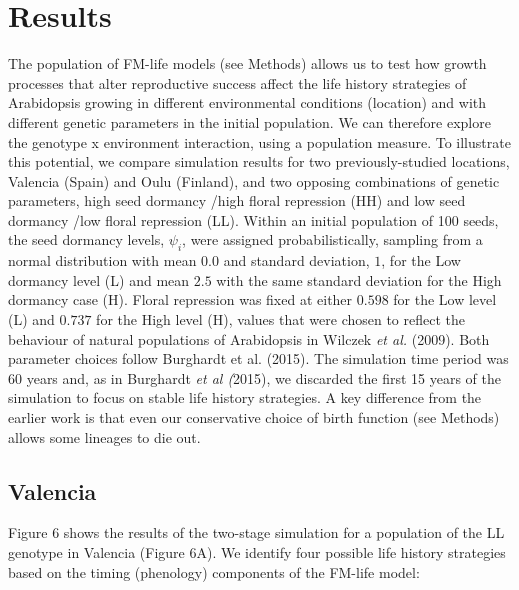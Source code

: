 \documentclass[phd]{infthesis}
\begin{document}
\section{Results}
\label{results}

The population of FM-life models (see Methods) allows us to test how
growth processes that alter reproductive success affect the life history
strategies of Arabidopsis growing in different environmental conditions
(location) and with different genetic parameters in the initial
population. We can therefore explore the genotype x environment
interaction, using a population measure. To illustrate this potential,
we compare simulation results for two previously-studied locations,
Valencia (Spain) and Oulu (Finland), and two opposing combinations of
genetic parameters, high seed dormancy /high floral repression (HH) and
low seed dormancy /low floral repression (LL). Within an initial
population of 100 seeds, the seed dormancy levels, \(\psi_{i}\), were
assigned probabilistically, sampling from a normal distribution with
mean \(0.0\) and standard deviation, \(1\), for the Low dormancy level
(L) and mean \(2.5\) with the same standard deviation for the High
dormancy case (H). Floral repression was fixed at either \(0.598\) for
the Low level (L) and \(0.737\) for the High level (H), values that were
chosen to reflect the behaviour of natural populations of Arabidopsis in
Wilczek \emph{et al.} (2009). Both parameter choices follow Burghardt et
al. (2015). The simulation time period was 60 years and, as in Burghardt
\emph{et al (}2015), we discarded the first 15 years of the simulation
to focus on stable life history strategies. A key difference from the
earlier work is that even our conservative choice of birth function (see
Methods) allows some lineages to die out.

\subsection{Valencia}
\label{valencia}

Figure 6 shows the results of the two-stage simulation for a population
of the LL genotype in Valencia (Figure 6A). We identify four possible
life history strategies based on the timing (phenology) components of
the FM-life model:
\end{document}
